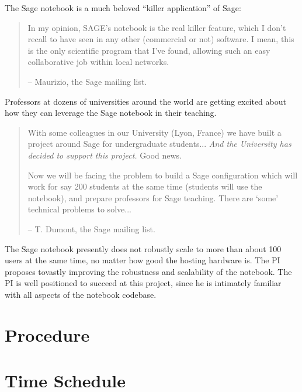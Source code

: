 \documentclass[11pt]{article}
\begin{document}
The Sage notebook is a much beloved ``killer application'' of Sage:
\begin{quote}
  In my opinion, SAGE's notebook is the real killer feature, which I
  don't recall to have seen in any other (commercial or not)
  software. I mean, this is the only scientific program that I've
  found, allowing such an easy collaborative job within local
  networks.

 -- Maurizio, the Sage mailing list.
\end{quote}

Professors at dozens of universities around the world are getting
excited about how they can leverage the Sage notebook in their
teaching.
\begin{quote}
With some colleagues in our University (Lyon, France) we have built a
project around Sage for undergraduate students... {\em And the University has
decided to support this project.} Good news.

Now we will be facing the problem to build a Sage configuration which
will work for say 200 students at the same time (students will use the
notebook), and prepare professors for Sage teaching. There are `some'
technical problems to solve...
 
-- T. Dumont, the Sage mailing list.
\end{quote}

The Sage notebook presently does not robustly scale to more than about
100 users at the same time, no matter how good the hosting hardware
is.  The PI proposes tovastly improving the robustness and scalability
of the notebook.  The PI is well positioned to succeed at this
project, since he is intimately familiar with all aspects of the
notebook codebase.


\section{Procedure}



\section{Time Schedule}
\end{document}
